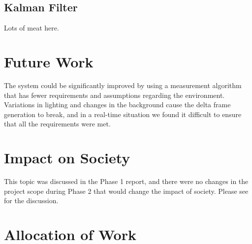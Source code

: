 \documentclass[11pt]{article} %
\begin{document}
\subsection{Kalman Filter}
Lots of meat here.
\section{Future Work}
The system could be significantly improved by using a measurement algorithm that has fewer requirements and assumptions regarding the environment. Variations in lighting and changes in the background cause the delta frame generation to break, and in a real-time situation we found it difficult to ensure that all the requirements were met.
\section{Impact on Society}
This topic was discussed in the Phase 1 report, and there were no changes in the project scope during Phase 2 that would change the impact of society. Please see \cite{15} for the discussion.
\section{Allocation of Work}
\end{document}
